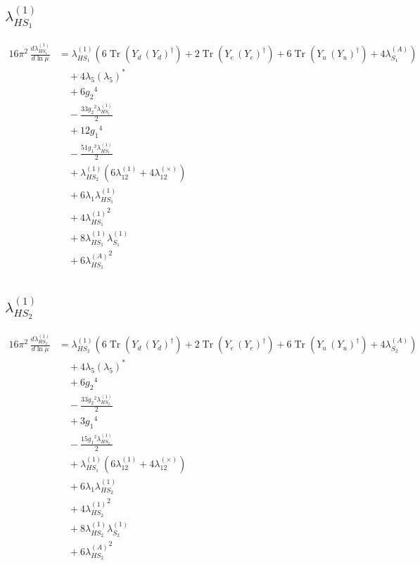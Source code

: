 \documentclass[10pt,a4paper]{article}
\begin{document}
\subsection*{$\lambda_{HS_1}^{(1)}$}
\begin{align*}
16\pi^2\,\frac{d \lambda_{HS_1}^{(1)}}{d\ln\mu} &={\lambda_{HS_1}^{(1)}} (6 \operatorname{Tr}\!\left({Y_d}\,\left({Y_d}\right)^{\dagger}\right)+2 \operatorname{Tr}\!\left({Y_e}\,\left({Y_e}\right)^{\dagger}\right)+6 \operatorname{Tr}\!\left({Y_u}\,\left({Y_u}\right)^{\dagger}\right)+4 {\lambda_{S_1}^{(A)}}) \\
&\quad +4 {\lambda_5} \left({\lambda_5}\right)^{*} \\
&\quad +6 {g_2}^4 \\
&\quad -\frac{33 {g_2}^2 {\lambda_{HS_1}^{(1)}}}{2} \\
&\quad +12 {g_1}^4 \\
&\quad -\frac{51 {g_1}^2 {\lambda_{HS_1}^{(1)}}}{2} \\
&\quad +{\lambda_{HS_2}^{(1)}} (6 {\lambda_{12}^{(1)}}+4 {\lambda_{12}^{(\times)}}) \\
&\quad +6 {\lambda_1} {\lambda_{HS_1}^{(1)}} \\
&\quad +4 {\lambda_{HS_1}^{(1)}}^2 \\
&\quad +8 {\lambda_{HS_1}^{(1)}} {\lambda_{S_1}^{(1)}} \\
&\quad +6 {\lambda_{HS_1}^{(A)}}^2 \\
\end{align*}
\subsection*{$\lambda_{HS_2}^{(1)}$}
\begin{align*}
16\pi^2\,\frac{d \lambda_{HS_2}^{(1)}}{d\ln\mu} &={\lambda_{HS_2}^{(1)}} (6 \operatorname{Tr}\!\left({Y_d}\,\left({Y_d}\right)^{\dagger}\right)+2 \operatorname{Tr}\!\left({Y_e}\,\left({Y_e}\right)^{\dagger}\right)+6 \operatorname{Tr}\!\left({Y_u}\,\left({Y_u}\right)^{\dagger}\right)+4 {\lambda_{S_2}^{(A)}}) \\
&\quad +4 {\lambda_5} \left({\lambda_5}\right)^{*} \\
&\quad +6 {g_2}^4 \\
&\quad -\frac{33 {g_2}^2 {\lambda_{HS_2}^{(1)}}}{2} \\
&\quad +3 {g_1}^4 \\
&\quad -\frac{15 {g_1}^2 {\lambda_{HS_2}^{(1)}}}{2} \\
&\quad +{\lambda_{HS_1}^{(1)}} (6 {\lambda_{12}^{(1)}}+4 {\lambda_{12}^{(\times)}}) \\
&\quad +6 {\lambda_1} {\lambda_{HS_2}^{(1)}} \\
&\quad +4 {\lambda_{HS_2}^{(1)}}^2 \\
&\quad +8 {\lambda_{HS_2}^{(1)}} {\lambda_{S_2}^{(1)}} \\
&\quad +6 {\lambda_{HS_2}^{(A)}}^2 \\
\end{align*}
\end{document}

